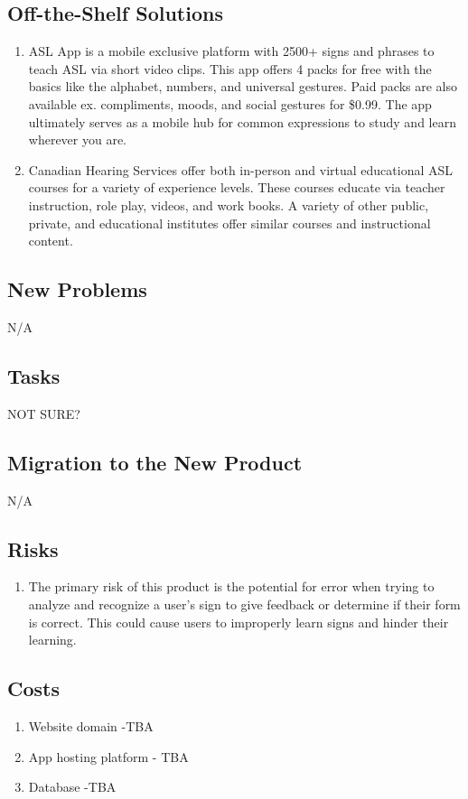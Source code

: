 \documentclass[12pt, titlepage]{article}
\begin{document}
\subsection{Off-the-Shelf Solutions}
\begin{enumerate}
    \item ASL App is a mobile exclusive platform with 2500+ signs and phrases to teach ASL via short video clips. This app offers 4 packs for free with the basics like the alphabet, numbers, and universal gestures. Paid packs are also available ex. compliments, moods, and social gestures for \$0.99. The app ultimately serves as a mobile hub for common expressions to study and learn wherever you are.
    \item Canadian Hearing Services offer both in-person and virtual educational ASL courses for a variety of experience levels. These courses educate via teacher instruction, role play, videos, and work books.
    A variety of other public, private, and educational institutes offer similar courses and instructional content.
\end{enumerate}

\subsection{New Problems}

N/A

\subsection{Tasks}
NOT SURE?
\subsection{Migration to the New Product}
N/A
\subsection{Risks}

\begin{enumerate}
    \item The primary risk of this product is the potential for error when trying to analyze and recognize a user's sign to give feedback or determine if their form is correct. This could cause users to improperly learn signs and hinder their learning.
\end{enumerate}

\subsection{Costs}
\begin{enumerate}
    \item Website domain -TBA
    \item App hosting platform - TBA
    \item Database -TBA
\end{enumerate}
\end{document}
